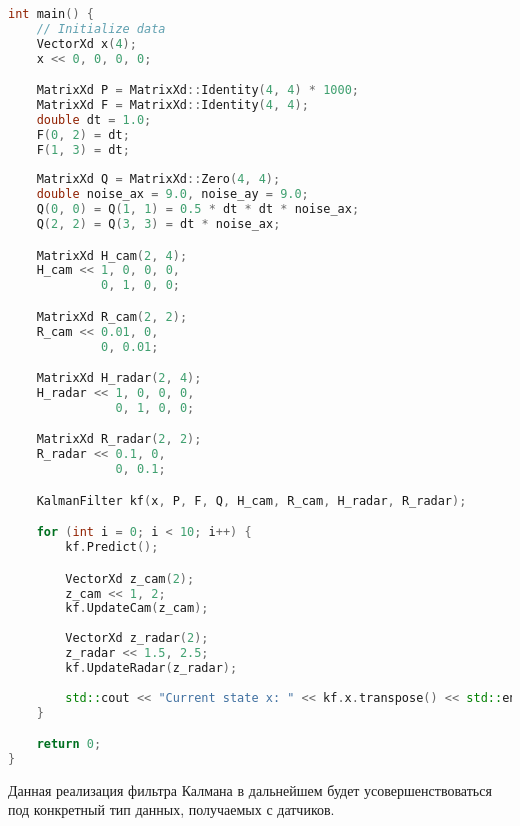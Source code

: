 \begin{lstlisting}[language=C++]
int main() {
    // Initialize data
    VectorXd x(4);
    x << 0, 0, 0, 0;

    MatrixXd P = MatrixXd::Identity(4, 4) * 1000;
    MatrixXd F = MatrixXd::Identity(4, 4);
    double dt = 1.0;
    F(0, 2) = dt;
    F(1, 3) = dt;
    
    MatrixXd Q = MatrixXd::Zero(4, 4);
    double noise_ax = 9.0, noise_ay = 9.0;
    Q(0, 0) = Q(1, 1) = 0.5 * dt * dt * noise_ax;
    Q(2, 2) = Q(3, 3) = dt * noise_ax;

    MatrixXd H_cam(2, 4);
    H_cam << 1, 0, 0, 0,
             0, 1, 0, 0;

    MatrixXd R_cam(2, 2);
    R_cam << 0.01, 0,
             0, 0.01;

    MatrixXd H_radar(2, 4);
    H_radar << 1, 0, 0, 0,
               0, 1, 0, 0;

    MatrixXd R_radar(2, 2);
    R_radar << 0.1, 0,
               0, 0.1;

    KalmanFilter kf(x, P, F, Q, H_cam, R_cam, H_radar, R_radar);

    for (int i = 0; i < 10; i++) {
        kf.Predict();

        VectorXd z_cam(2);
        z_cam << 1, 2;
        kf.UpdateCam(z_cam);
        
        VectorXd z_radar(2);
        z_radar << 1.5, 2.5;
        kf.UpdateRadar(z_radar);
        
        std::cout << "Current state x: " << kf.x.transpose() << std::endl;
    }

    return 0;
}
\end{lstlisting}

Данная реализация фильтра Калмана в дальнейшем будет усовершенствоваться под конкретный тип 
данных, получаемых с датчиков. 
